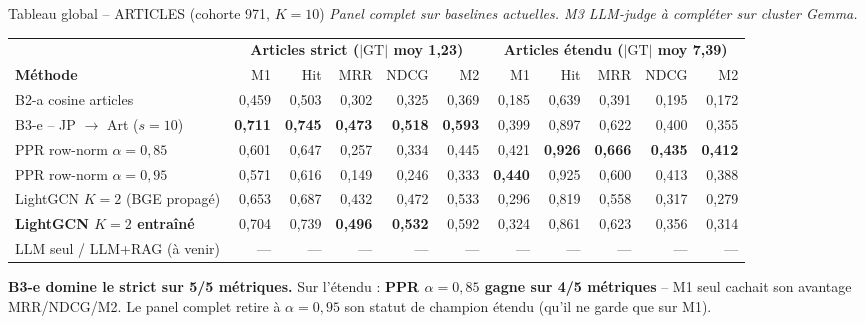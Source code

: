 \documentclass[aspectratio=169,10pt]{beamer}
\newcommand{\keybox}[1]{%
  \begin{center}
  \colorbox{accentsoft}{\parbox{0.92\linewidth}{\centering #1}}
  \end{center}}
\begin{document}
\begin{frame}{Tableau global -- ARTICLES (cohorte 971, $K{=}10$)}
  \scriptsize
  \textit{Panel complet sur baselines actuelles. M3 LLM-judge à compléter sur cluster Gemma.}

  \vspace{0.3em}
  \renewcommand{\arraystretch}{1.15}
  \setlength{\tabcolsep}{3.5pt}
  \begin{center}
  \begin{tabular}{@{}l | r r r r r | r r r r r@{}}
    \toprule
     & \multicolumn{5}{c|}{\textbf{Articles strict ($|\mathrm{GT}|$ moy 1,23)}}
     & \multicolumn{5}{c}{\textbf{Articles étendu ($|\mathrm{GT}|$ moy 7,39)}} \\
    \textbf{Méthode}
     & M1 & Hit & MRR & NDCG & M2
     & M1 & Hit & MRR & NDCG & M2 \\
    \midrule
    B2-a cosine articles
     & 0,459 & 0,503 & 0,302 & 0,325 & 0,369
     & 0,185 & 0,639 & 0,391 & 0,195 & 0,172 \\
    \rowcolor{accentsoft}
    B3-e -- JP $\to$ Art ($s{=}10$)
     & \textbf{0,711} & \textbf{0,745} & \textbf{0,473} & \textbf{0,518} & \textbf{0,593}
     & 0,399 & 0,897 & 0,622 & 0,400 & 0,355 \\
    \rowcolor{green!10}
    PPR row-norm $\alpha=0{,}85$
     & 0,601 & 0,647 & 0,257 & 0,334 & 0,445
     & 0,421 & \textbf{0,926} & \textbf{0,666} & \textbf{0,435} & \textbf{0,412} \\
    PPR row-norm $\alpha=0{,}95$
     & 0,571 & 0,616 & 0,149 & 0,246 & 0,333
     & \textbf{0,440} & 0,925 & 0,600 & 0,413 & 0,388 \\
    \midrule
    \rowcolor{green!10}
    LightGCN $K{=}2$ (BGE propagé)
     & 0,653 & 0,687 & 0,432 & 0,472 & 0,533
     & 0,296 & 0,819 & 0,558 & 0,317 & 0,279 \\
    \rowcolor{green!10}
    \textbf{LightGCN $K{=}2$ entraîné}
     & 0,704 & 0,739 & \textbf{0,496} & \textbf{0,532} & 0,592
     & 0,324 & 0,861 & 0,623 & 0,356 & 0,314 \\
    \midrule
    LLM seul / LLM+RAG (à venir)        & --- & --- & --- & --- & --- & --- & --- & --- & --- & --- \\
    \bottomrule
  \end{tabular}
  \end{center}

  \vspace{0.4em}
  \keybox{\scriptsize \textbf{B3-e domine le strict sur 5/5 métriques.}
  Sur l'étendu : \textbf{PPR $\alpha=0{,}85$ gagne sur 4/5 métriques} -- M1 seul cachait son
  avantage MRR/NDCG/M2. Le panel complet retire à $\alpha=0{,}95$ son statut de champion
  étendu (qu'il ne garde que sur M1).}
\end{frame}
\end{document}
